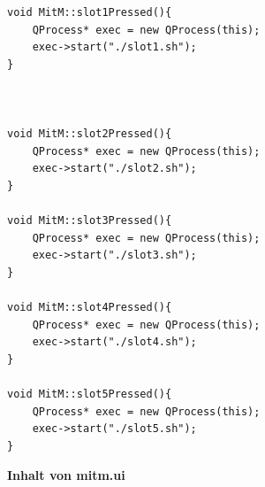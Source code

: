\begin{lstlisting}
void MitM::slot1Pressed(){
    QProcess* exec = new QProcess(this);
    exec->start("./slot1.sh");
}



void MitM::slot2Pressed(){
    QProcess* exec = new QProcess(this);
    exec->start("./slot2.sh");
}

void MitM::slot3Pressed(){
    QProcess* exec = new QProcess(this);
    exec->start("./slot3.sh");
}

void MitM::slot4Pressed(){
    QProcess* exec = new QProcess(this);
    exec->start("./slot4.sh");
}

void MitM::slot5Pressed(){
    QProcess* exec = new QProcess(this);
    exec->start("./slot5.sh");
}

\end{lstlisting}



\textbf{Inhalt von mitm.ui}

